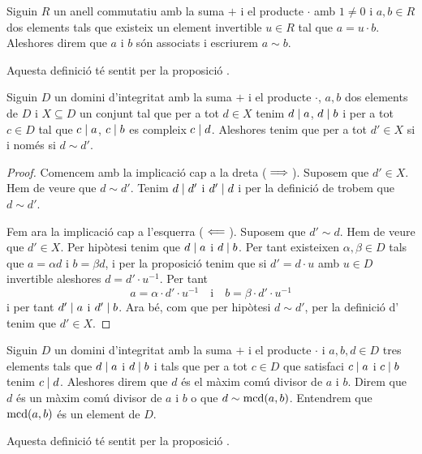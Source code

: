 \documentclass[../Apunts.tex]{subfiles}
\begin{document}
	\begin{definition}
		\label{def:elements associats}
		Siguin \(R\) un anell commutatiu amb la suma \(+\) i el producte \(\cdot\) amb \(1\neq0\) i \(a,b\in R\) dos elements tals que existeix un element invertible \(u\in R\) tal que \(a=u\cdot b\). Aleshores direm que \(a\) i \(b\) són associats i escriurem \(a\sim b\).
		
		Aquesta definició té sentit per la proposició .
	\end{definition}
	\begin{proposition}
		\label{prop:màxim comú divisor anells}
		Siguin \(D\) un domini d'integritat amb la suma \(+\) i el producte \(\cdot\), \(a,b\) dos elements de \(D\) i \(X\subseteq D\) un conjunt tal que per a tot \(d\in X\) tenim \(d\mathrel{|} a\), \(d\mathrel{|} b\) i per a tot \(c\in D\) tal que \(c\mathrel{|} a\), \(c\mathrel{|} b\) es compleix \(c\mathrel{|} d\). Aleshores tenim que per a tot \(d'\in X\) si i només si \(d\sim d'\).
		\begin{proof}
			Comencem amb la implicació cap a la dreta (\(\implies\)). Suposem que \(d'\in X\). Hem de veure que \(d\sim d'\). Tenim \(d\mathrel{|} d'\) i \(d'\mathrel{|} d\) i per la definició de  trobem que \(d\sim d'\).
			
			Fem ara la implicació cap a l'esquerra (\(\impliedby\)). Suposem que \(d'\sim d\). Hem de veure que \(d'\in X\). Per hipòtesi tenim que \(d\mathrel{|} a\) i \(d\mathrel{|} b\). Per tant existeixen \(\alpha,\beta\in D\) tals que \(a=\alpha d\) i \(b=\beta d\), i per la proposició  tenim que si \(d'=d\cdot u\) amb \(u\in D\) invertible aleshores \(d=d'\cdot u^{-1}\). Per tant
			\[a=\alpha\cdot d'\cdot u^{-1}\quad\text{i}\quad b=\beta\cdot d'\cdot u^{-1}\]
			i per tant \(d'\mathrel{|} a\) i \(d'\mathrel{|} b\). Ara bé, com que per hipòtesi \(d\sim d'\), per la definició d' tenim que \(d'\in X\).
		\end{proof}
	\end{proposition}
	\begin{definition}
		\label{def:màxim comú divisor anells}
		\label{def:mcd anells}
		Siguin \(D\) un domini d'integritat amb la suma \(+\) i el producte \(\cdot\) i \(a,b,d\in D\) tres elements tals que \(d\mathrel{|} a\) i \(d\mathrel{|} b\) i tals que per a tot \(c\in D\) que satisfaci \(c\mathrel{|} a\) i \(c\mathrel{|} b\) tenim \(c\mathrel{|} d\). Aleshores direm que \(d\) és el màxim comú divisor de \(a\) i \(b\). Direm que \(d\) és un màxim comú divisor de \(a\) i \(b\) o que \(d\sim\operatorname{mcd}(a,b)\).
		Entendrem que \(\operatorname{mcd}(a,b)\) és un element de \(D\).
		
		Aquesta definició té sentit per la proposició .
	\end{definition}
\end{document}
